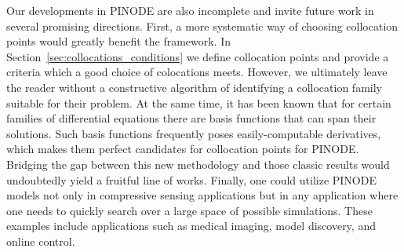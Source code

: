 	Our developments in PINODE are also incomplete and invite future work in several promising directions. First, a more systematic way of choosing collocation points would greatly benefit the framework. In Section~\ref{sec:collocations_conditions} we define collocation points and provide a criteria which a good choice of colocations meets. However, we ultimately leave the reader without a constructive algorithm of identifying a collocation family suitable for their problem. At the same time, it has been known that for certain families of differential equations there are basis functions that can span their solutions. Such basis functions frequently poses easily-computable derivatives, which makes them perfect candidates for collocation points for PINODE. Bridging the gap between this new methodology and those classic results would undoubtedly yield a fruitful line of works. Finally, one could utilize PINODE models not only in compressive sensing applications but in any application where one needs to quickly search over a large space of possible simulations. These examples include applications such as medical imaging, model discovery, and online control.
